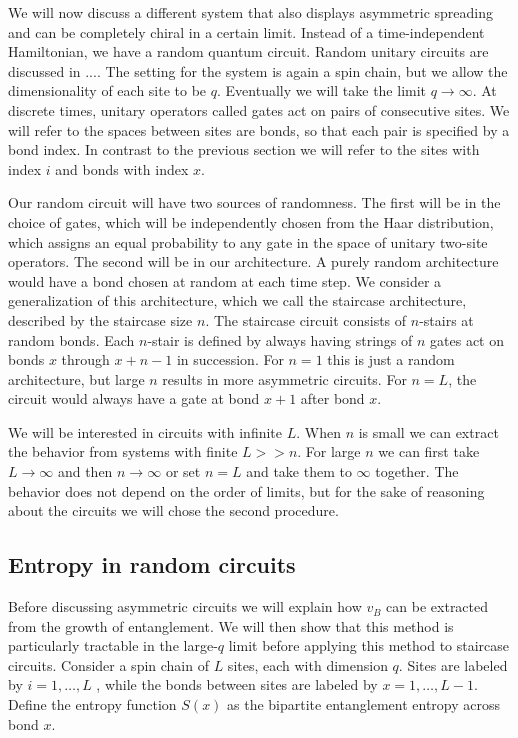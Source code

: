 \documentclass[aps,prx,reprint,superscriptaddress, longbibliography]{revtex4-1}
\begin{document}
We will now discuss a different system that also displays asymmetric spreading and can be completely chiral in a certain limit. Instead of a time-independent Hamiltonian, we have a random quantum circuit. Random unitary circuits are discussed in .... The setting for the system is again a spin chain, but we allow the dimensionality of each site to be $q$. Eventually we will take the limit $q\to\infty$. At discrete times, unitary operators called gates act on pairs of consecutive sites. We will refer to the spaces between sites are bonds, so that each pair is specified by a bond index. In contrast to the previous section we will refer to the sites with index $i$ and bonds with index $x$. 

Our random circuit will have two sources of randomness. The first will be in the choice of gates, which will be independently chosen from the Haar distribution, which assigns an equal probability to any gate in the space of unitary two-site operators. The second will be in our architecture. A purely random architecture would have a bond chosen at random at each time step. We consider a generalization of this architecture, which we call the staircase architecture, described by the staircase size $n$. The staircase circuit consists of $n$-stairs at random bonds. 
Each $n$-stair is defined by always having strings of $n$ gates act on bonds $x$ through $x+n-1$ in succession. For $n=1$ this is just a random architecture, but large $n$ results in more asymmetric circuits. For $n=L$, the circuit would always have a gate at bond $x+1$ after bond $x$.

We will be interested in circuits with infinite $L$. When $n$ is small we can extract the behavior from systems with finite $L>>n$. For large $n$ we can first take $L\to\infty$ and then $n\to\infty$ or set $n=L$ and take them to $\infty$ together. The behavior does not depend on the order of limits, but for the sake of reasoning about the circuits we will chose the second procedure.

\subsection{Entropy in random circuits}

Before discussing asymmetric circuits we will explain how $v_B$ can be extracted from the growth of entanglement. We will then show that this method is particularly tractable in the large-$q$ limit before applying this method to staircase circuits. 
Consider a spin chain of $L$ sites, each with dimension $q$. Sites are labeled by $i = 1,\dots, L$ , while the bonds between sites are labeled by $x = 1, \dots, L - 1$. Define the entropy function $S(x)$ as the bipartite entanglement entropy across bond $x$. 
\end{document}
